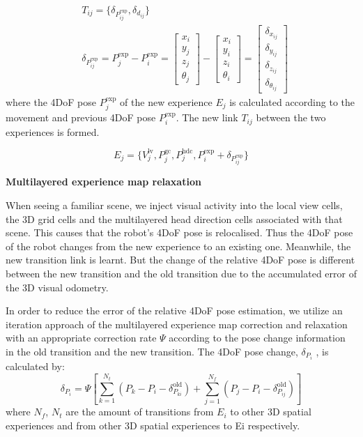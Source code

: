 \begin{equation}
	\begin{aligned}
		& T_{ij} = \{ \delta_{P_{ij}^\text{exp}}, \delta_{d_{ij}} \} \\
		& \delta_{P_{ij}^{\text{exp}}} = 
			P_j^\text{exp} - P_i^\text{exp} = 
			\left[
				\begin{matrix}
					x_i \\
					y_j \\
					z_j \\
					\theta_j
				\end{matrix}
			\right]
			- 
			\left[
				\begin{matrix}
					x_i \\
					y_i \\
					z_i \\
					\theta_i
				\end{matrix}
			\right]
			=
			\left[
				\begin{matrix}
					\delta_{x_{ij}} \\
					\delta_{y_{ij}} \\
					\delta_{z_{ij}} \\
					\delta_{\theta_{ij}}
				\end{matrix}
			\right]
	\end{aligned}
\end{equation}
%
where the 4DoF pose $P_j^{\text{exp}}$ of the new experience $E_j$ is calculated according to the movement and previous 4DoF pose $P_i^{\text{exp}}$. 
The new link $T_{ij}$ between the two experiences is formed.

\begin{equation}
	E_j = 
		\{
			V_j^\text{lv},
			P_j^\text{gc},
			P_j^\text{hdc},
			P_i^\text{exp} + \delta_{P_{ij}^\text{exp}}
		\}
\end{equation}

\textbf{Multilayered experience map relaxation}

When seeing a familiar scene, we inject visual activity into the local view cells, the 3D grid cells and the multilayered head direction cells associated with that scene. 
This causes that the robot's 4DoF pose is relocalised. 
Thus the 4DoF pose of the robot changes from the new experience to an existing one. 
Meanwhile, the new transition link is learnt. But the change of the relative 4DoF pose is different between the new transition and the old transition due to the accumulated error of the 3D visual odometry.


In order to reduce the error of the relative 4DoF pose estimation, we utilize an iteration approach of the multilayered experience map correction and relaxation with an appropriate correction rate $\Psi$ according to the pose change information in the old transition and the new transition. 
The 4DoF pose change, $\delta_{P_i}$ , is calculated by:
\begin{equation}
	\delta_{P_i} = 
		\Psi
		[
			\sum_{k=1}^{N_t}
			(P_k - P_i - \delta_{P_{ki}}^\text{old})
			+ 
			\sum_{j=1}^{N_f}
			(P_j - P_i - \delta_{P_{ij}}^\text{old})
		]
\end{equation}
where $N_f$, $N_t$ are the amount of transitions from $E_i$ to other 3D spatial experiences and from other 3D spatial experiences to Ei respectively.


